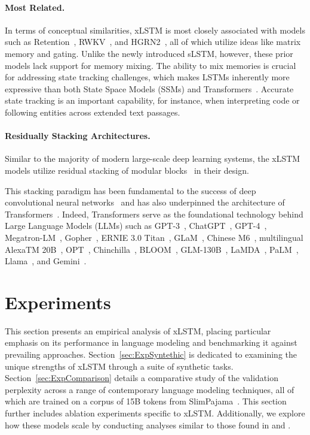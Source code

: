 \paragraph{Most Related.} In terms of conceptual similarities, xLSTM is most closely associated with models such as Retention~\citep{Sun:23arxiv}, RWKV~\citep{Peng:23arxivshort,Peng:24arxivshort}, and HGRN2~\citep{Qin:24arxiv}, all of which utilize ideas like matrix memory and gating. Unlike the newly introduced sLSTM, however, these prior models lack support for memory mixing. The ability to mix memories is crucial for addressing state tracking challenges, which makes LSTMs inherently more expressive than both State Space Models (SSMs) and Transformers~\citep{Merrill:24,Deletang:23}. Accurate state tracking is an important capability, for instance, when interpreting code or following entities across extended text passages.

\paragraph{Residually Stacking Architectures.} Similar to the majority of modern large-scale deep learning systems, the xLSTM models utilize residual stacking of modular blocks~\citep{Srivastava:15,He:16} in their design.

This stacking paradigm has been fundamental to the success of deep convolutional neural networks~\citep{He:16} and has also underpinned the architecture of Transformers~\citep{Vaswani:17}. Indeed, Transformers serve as the foundational technology behind Large Language Models (LLMs) such as GPT-3~\citep{Brown:20short}, ChatGPT~\citep{Schulman:22short}, GPT-4~\citep{Achiam:23gpt4short}, Megatron-LM~\citep{Shoeybi:19}, Gopher~\citep{Rae:21short}, ERNIE 3.0 Titan~\citep{Wang:21arxivshort}, GLaM~\citep{Du:21glamshort}, Chinese M6~\citep{Lin:21}, multilingual AlexaTM 20B~\citep{Soltan:22}, OPT~\citep{Zhang:22opt}, Chinchilla~\citep{Hoffmann:22short}, BLOOM~\citep{Scao:22arxivshort}, GLM-130B~\citep{Zeng:22arxivshort}, LaMDA~\citep{Thoppilan:22short}, PaLM~\citep{Chowdhery:22short}, Llama~\citep{Touvron:23arxiv}, and Gemini~\citep{GeminiTeam:23arxiv,Reid:24arxiv}.

\section{Experiments}
\label{sec:Exp}

This section presents an empirical analysis of xLSTM, placing particular emphasis on its performance in language modeling and benchmarking it against prevailing approaches. Section~\ref{sec:ExpSyntethic} is dedicated to examining the unique strengths of xLSTM through a suite of synthetic tasks. Section~\ref{sec:ExpComparison} details a comparative study of the validation perplexity across a range of contemporary language modeling techniques, all of which are trained on a corpus of 15B tokens from SlimPajama~\citep{Soboleva:23}. This section further includes ablation experiments specific to xLSTM. Additionally, we explore how these models scale by conducting analyses similar to those found in \citet{Kaplan:20} and \citet{Brown:20short}.

